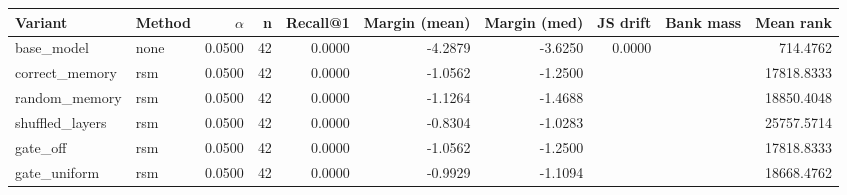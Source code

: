 \begin{tabular}{l l r r r r r r r r}
\toprule
Variant & Method & $\alpha$ & n & Recall@1 & Margin (mean) & Margin (med) & JS drift & Bank mass & Mean rank \\
\midrule
base\_model & none & 0.0500 & 42 & 0.0000 & -4.2879 & -3.6250 & 0.0000 &  & 714.4762 \\
correct\_memory & rsm & 0.0500 & 42 & 0.0000 & -1.0562 & -1.2500 &  &  & 17818.8333 \\
random\_memory & rsm & 0.0500 & 42 & 0.0000 & -1.1264 & -1.4688 &  &  & 18850.4048 \\
shuffled\_layers & rsm & 0.0500 & 42 & 0.0000 & -0.8304 & -1.0283 &  &  & 25757.5714 \\
gate\_off & rsm & 0.0500 & 42 & 0.0000 & -1.0562 & -1.2500 &  &  & 17818.8333 \\
gate\_uniform & rsm & 0.0500 & 42 & 0.0000 & -0.9929 & -1.1094 &  &  & 18668.4762 \\
\bottomrule
\end{tabular}

